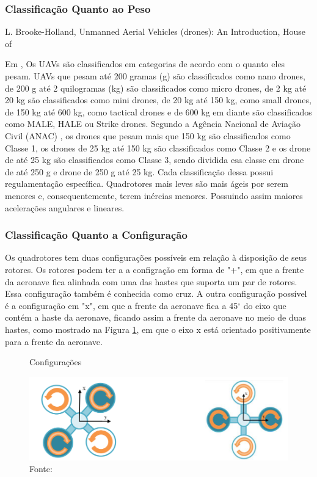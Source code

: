 \subsubsection{Classificação Quanto ao Peso}
L. Brooke-Holland, Unmanned Aerial Vehicles (drones): An Introduction, House of

Em \cite{brooke2012unmanned}, Os UAVs são classificados em categorias de acordo com o quanto eles pesam. UAVs que pesam até 200 gramas (g) são classificados como nano drones, de 200 g até 2 quilogramas (kg) são classificados como micro drones, de 2 kg até 20 kg são classificados como mini drones, de 20 kg até 150 kg, como small drones, de 150 kg até 600 kg, como tactical drones e de 600 kg em diante são classificados como MALE, HALE ou Strike drones. Segundo a Agência Nacional de Aviação Civil (ANAC) \cite{ANAC2021}, os drones que pesam mais que 150 kg são classificados como Classe 1, os drones de 25 kg até 150 kg são classificados como Classe 2 e os drone de até 25 kg são classificados como Classe 3, sendo dividida esa classe em drone de até 250 g e drone de 250 g até 25 kg. Cada classificação dessa possui regulamentação específica. Quadrotores mais leves são mais ágeis por serem menores e, consequentemente, terem inércias menores. Possuindo assim maiores acelerações angulares e lineares.

\subsubsection{Classificação Quanto a Configuração}
Os quadrotores tem duas configurações possíveis em relação à disposição de seus rotores. Os rotores podem ter a a configração em forma de "+", em que a frente da aeronave fica alinhada com uma das hastes que suporta um par de rotores. Essa configuração também é conhecida como cruz. A outra configuração possível é a configuração em "x", em que a frente da aeronave fica a 45$^{\circ}$ do eixo que contém a haste da aeronave, ficando assim a frente da aeronave no meio de duas hastes, como mostrado na Figura \ref{fig:configs}, em que o eixo x está orientado positivamente para a frente da aeronave. 

\begin{figure} [h!]	
  \centering
  \caption{Configurações}
  \includegraphics[width=1\textwidth]{Figures/configs.png}
  \caption*{Fonte: \cite{NorouziGhazbi2016}}
  \label{fig:configs}
\end{figure}

